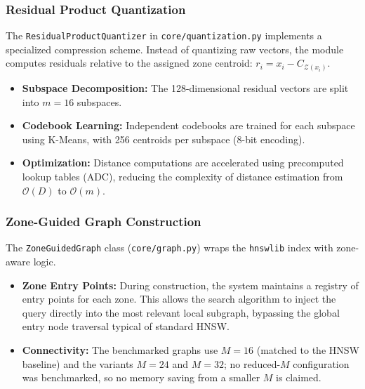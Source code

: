 \documentclass[conference]{IEEEtran}
\begin{document}
\subsubsection{Residual Product Quantization}
The \texttt{ResidualProductQuantizer} in \texttt{core/quantization.py} implements a specialized compression scheme. Instead of quantizing raw vectors, the module computes residuals relative to the assigned zone centroid: $r_i = x_i - C_{\mathcal{Z}(x_i)}$.
\begin{itemize}
    \item \textbf{Subspace Decomposition:} The 128-dimensional residual vectors are split into $m=16$ subspaces.
    \item \textbf{Codebook Learning:} Independent codebooks are trained for each subspace using K-Means, with 256 centroids per subspace (8-bit encoding).
    \item \textbf{Optimization:} Distance computations are accelerated using precomputed lookup tables (ADC), reducing the complexity of distance estimation from $\mathcal{O}(D)$ to $\mathcal{O}(m)$.
\end{itemize}

\subsubsection{Zone-Guided Graph Construction}
The \texttt{ZoneGuidedGraph} class (\texttt{core/graph.py}) wraps the \texttt{hnswlib} index with zone-aware logic.
\begin{itemize}
    \item \textbf{Zone Entry Points:} During construction, the system maintains a registry of entry points for each zone. This allows the search algorithm to inject the query directly into the most relevant local subgraph, bypassing the global entry node traversal typical of standard HNSW.
    \item \textbf{Connectivity:} The benchmarked graphs use $M=16$ (matched to the HNSW baseline) and the variants $M=24$ and $M=32$; no reduced-$M$ configuration was benchmarked, so no memory saving from a smaller $M$ is claimed.
\end{itemize}
\end{document}
